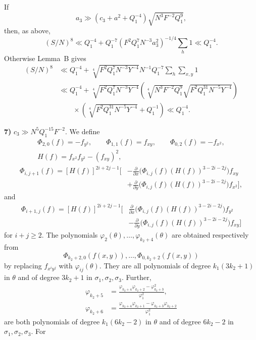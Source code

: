\documentclass[10pt]{article}
\begin{document}
If
\[
  a_3\gg(c_3+a^2+Q_1^{-4})\sqrt{N^3F^{-2}Q_1^9},
\]
then, as above,
\[
  (S/N)^8\ll Q_1^{-4}
  +Q_1^{-7}(F^2Q_1^7N^{-3}a_3^2)^{-1/4}\sum_h1
  \ll Q_1^{-4}.
\]
Otherwise Lemma~B gives
\[
\begin{aligned}
(S/N)^8
&\ll Q_1^{-4}
 +\sqrt[4]{F^2Q_1^7N^{-3}Y^{-4}}
  N^{-1}Q_1^{-7}\sum_h\sum_{x,y}1\\
&\ll Q_1^{-4}
 +\sqrt[4]{F^2Q_1^7N^{-3}Y^{-4}}
 \left(\sqrt[4]{N^3F^{-2}Q_1^9}
       \sqrt{F^2Q_1^{31}N^{-5}Y^{-4}}\right)\\
&\qquad\times
 \left(\sqrt[4]{F^2Q_1^{31}N^{-5}Y^{-4}}+Q_1^{-1}\right)
 \ll Q_1^{-4}.
\end{aligned}
\]

\medskip
\noindent\textbf{7)} $c_3\gg N^5Q_1^{-15}F^{-2}$. We define
\[
\begin{gathered}
 \Phi_{2,0}(f)=-f_{y^2},\qquad
 \Phi_{1,1}(f)=f_{xy},\qquad
 \Phi_{0,2}(f)=-f_{x^2},\\
 H(f)=f_{x^2}f_{y^2}-(f_{xy})^2,
\end{gathered}
\]
\[
\begin{aligned}
\Phi_{i,j+1}(f)=[H(f)]^{2i+2j-1}\Bigg[&
 -\frac{\partial}{\partial x}
  \bigl(\Phi_{i,j}(f)(H(f))^{3-2i-2j}\bigr)f_{xy}\\
&+\frac{\partial}{\partial y}
  \bigl(\Phi_{i,j}(f)(H(f))^{3-2i-2j}\bigr)f_{x^2}
\Bigg],
\end{aligned}
\]
and
\[
\begin{aligned}
\Phi_{i+1,j}(f)=[H(f)]^{2i+2j-1}\Bigg[&
 \frac{\partial}{\partial x}
  \bigl(\Phi_{i,j}(f)(H(f))^{3-2i-2j}\bigr)f_{y^2}\\
&-\frac{\partial}{\partial y}
  \bigl(\Phi_{i,j}(f)(H(f))^{3-2i-2j}\bigr)f_{xy}
\Bigg]
\end{aligned}
\]
for $i+j\geqslant2$. The polynomials
$\varphi_2(\theta),\ldots,\varphi_{k_2+4}(\theta)$ are obtained respectively from
\[
  \Phi_{k_2+2,0}(f(x,y)),\ldots,\Phi_{0,k_2+2}(f(x,y))
\]
by replacing $f_{x^iy^j}$ with $\varphi_{ij}(\theta)$. They are all polynomials of degree $k_1(3k_2+1)$ in $\theta$ and of degree $3k_2+1$ in $\sigma_1,\sigma_2,\sigma_3$. Further,
\[
\begin{aligned}
 \varphi_{k_2+5}
 &=\frac{\varphi_{k_2+4}\varphi_{k_2+2}-\varphi_{k_2+3}^2}
        {\varphi_1^2},\\
 \varphi_{k_2+6}
 &=\frac{\varphi_{k_2+4}\varphi_{k_2+1}
          -\varphi_{k_2+3}\varphi_{k_2+2}}
        {\varphi_1^2}
\end{aligned}
\]
are both polynomials of degree $k_1(6k_2-2)$ in $\theta$ and of degree $6k_2-2$ in $\sigma_1,\sigma_2,\sigma_3$. For
\end{document}
